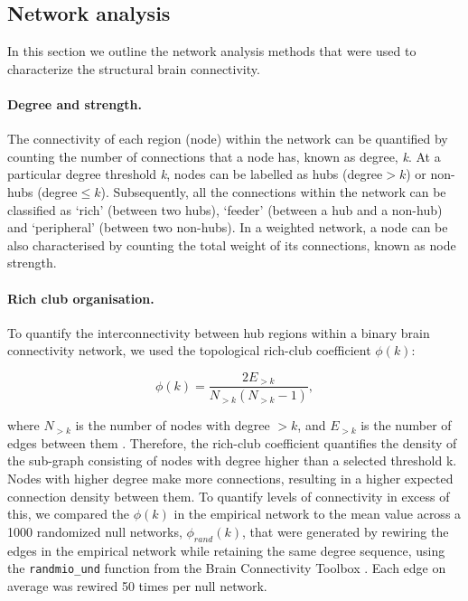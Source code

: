 \subsection{Network analysis} 
In this section we outline the network analysis methods that were used to characterize the structural brain connectivity. 

\paragraph*{Degree and strength.}

The connectivity of each region (node) within the network can be quantified by counting the number of connections that a node has, known as degree, \textit{k}. At a particular degree threshold \textit{k}, nodes can be labelled as hubs (degree$>k$) or non-hubs (degree$\leq k$). Subsequently, all the connections within the network can be classified as `rich' (between two hubs), `feeder' (between a hub and a non-hub) and `peripheral' (between two non-hubs). In a weighted network, a node can be also characterised by counting the total weight of its connections, known as node strength. 

\paragraph*{Rich club organisation.}

To quantify the interconnectivity between hub regions within a binary brain connectivity network, we used the topological rich-club coefficient $\phi(k)$:

\begin{equation}
    \label{eqn:Ch5Eq1}
    \phi(k) = \frac{2E_{>k}}{N_{>k}(N_{>k}-1)},
\end{equation}

where $N_{>k}$ is the number of nodes with degree $>k$, and $E_{>k}$ is the number of edges between them \citep{Colizza2006}. Therefore, the rich-club coefficient quantifies the density of the sub-graph consisting of nodes with degree higher than a selected threshold k. Nodes with higher degree make more connections, resulting in a higher expected connection density between them. To quantify levels of connectivity in excess of this, we compared the $\phi(k)$ in the empirical network to the mean value across a 1000 randomized null networks, $\phi_{rand}(k)$, that were generated by rewiring the edges in the empirical network while retaining the same degree sequence, using the \texttt{randmio\_und} function from the Brain Connectivity Toolbox \citep{Rubinov2010}. Each edge on average was rewired 50 times per null network. 

